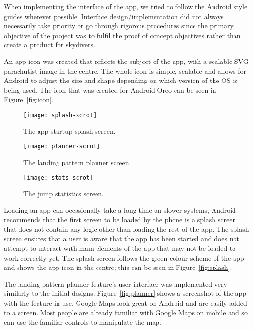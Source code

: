 When implementing the interface of the app, we tried to follow the Android style guides wherever possible. Interface design/implementation did not always necessarily take priority or go through rigorous procedures since the primary objective of the project was to fulfil the proof of concept objectives rather than create a product for skydivers.

An app icon was created that reflects the subject of the app, with a scalable SVG parachutist image in the centre. The whole icon is simple, scalable and allows for Android to adjust the size and shape depending on which version of the OS is being used. The icon that was created for Android Oreo can be seen in Figure~\vref{fig:icon}.

\begin{figure}[ht]
  \centering
  \captionsetup{width=0.24\textwidth}
  \begin{minipage}[b]{0.25\textwidth}
    \texttt{[image: splash-scrot]}
    \caption{The app startup splash screen.}\label{fig:splash}
  \end{minipage}%
  \hspace{1.5cm}
  \begin{minipage}[b]{0.25\textwidth}
    \texttt{[image: planner-scrot]}
    \caption{The landing pattern planner screen.}\label{fig:planner}
  \end{minipage}%
  \hspace{1.5cm}
  \begin{minipage}[b]{0.25\textwidth}
    \texttt{[image: stats-scrot]}
    \caption{The jump statistics screen.}\label{fig:stats}
  \end{minipage}
\end{figure}

Loading an app can occasionally take a long time on slower systems, Android recommends that the first screen to be loaded by the phone is a splash screen that does not contain any logic other than loading the rest of the app. The splash screen ensures that a user is aware that the app has been started and does not attempt to interact with main elements of the app that may not be loaded to work correctly yet. The splash screen follows the green colour scheme of the app and shows the app icon in the centre; this can be seen in Figure~\vref{fig:splash}.

The landing pattern planner feature's user interface was implemented very similarly to the initial designs. Figure~\vref{fig:planner} shows a screenshot of the app with the feature in use. Google Maps look great on Android and are easily added to a screen. Most people are already familiar with Google Maps on mobile and so can use the familiar controls to manipulate the map.

